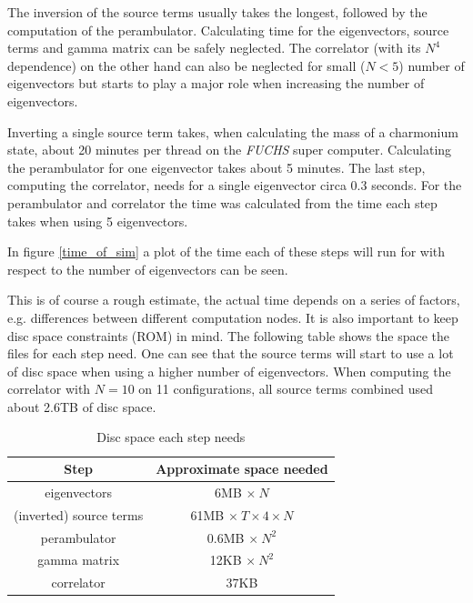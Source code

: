 \noindent
The inversion of the source terms usually takes the longest, followed by the computation of the perambulator. Calculating time for the eigenvectors, source terms and gamma matrix can be safely neglected. The correlator (with its $N^4$ dependence) on the other hand can also be neglected for small ($N<5$) number of eigenvectors but starts to play a major role when increasing the number of eigenvectors.

Inverting a single source term takes, when calculating the mass of a charmonium state, about 20 minutes per thread on the \textit{FUCHS} super computer. Calculating the perambulator for one eigenvector takes about 5 minutes. The last step, computing the correlator, needs for a single eigenvector circa 0.3 seconds. For the perambulator and correlator the time was calculated from the time each step takes when using 5 eigenvectors.

In figure \ref{time_of_sim} a plot of the time each of these steps will run for with respect to the number of eigenvectors can be seen.

This is of course a rough estimate, the actual time depends on a series of factors, e.g. differences between different computation nodes. It is also important to keep disc space constraints (ROM) in mind. The following table shows the space the files for each step need. One can see that the source terms will start to use a lot of disc space when using a higher number of eigenvectors. When computing the correlator with $N = 10$ on 11 configurations, all source terms combined used about 2.6TB of disc space.

\begin{table}[h]
            \centering
            \begin{tabular}{|c|c|}
            \hline
            \multicolumn{1}{|c|}{Step} & \multicolumn{1}{c|}{Approximate space needed} \\ \hline
             eigenvectors & 6MB $\times\ N$\\
             (inverted) source terms & 61MB $\times\ T \times 4 \times N$\\
             perambulator & 0.6MB $\times\ N^2$\\
             gamma matrix & 12KB $\times\ N^2$\\
             correlator & 37KB\\
              \hline
            \end{tabular}
            \caption{Disc space each step needs}
            \label{disc_space}
        \end{table}

